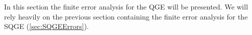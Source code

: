 In this section the finite error analysis for the QGE will be presented. We will rely heavily on the
previous section containing the finite error analysis for the SQGE (\autoref{sec:SQGEErrors}).
